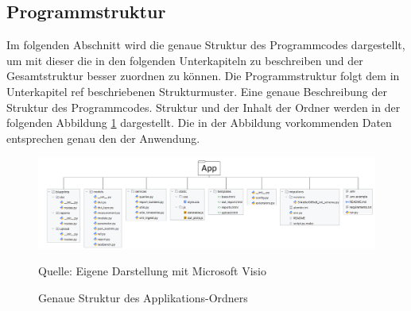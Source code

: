 \subsection{Programmstruktur}
\label{subsec:programmstruktur}


Im folgenden Abschnitt wird die genaue Struktur des Programmcodes dargestellt, um mit dieser die in den folgenden
Unterkapiteln zu beschreiben und der Gesamtstruktur besser zuordnen zu können.
Die Programmstruktur folgt dem in Unterkapitel ref beschriebenen Strukturmuster.
Eine genaue Beschreibung der Struktur des Programmcodes.
Struktur und der Inhalt der Ordner werden in der folgenden Abbildung \ref{fig: Genaue Struktur des Applikations-Ordners} dargestellt.
Die in der Abbildung vorkommenden Daten entsprechen genau den der Anwendung.


\begin{figure}[H]
    \centering
    \includegraphics[width=1\textwidth]{Grafiken/Min Ordnerstruktur Projekt.png}
    \caption{Genaue Struktur des Applikations-Ordners}
    \label{fig: Genaue Struktur des Applikations-Ordners}
    {Quelle: Eigene Darstellung mit Microsoft Visio}
\end{figure}